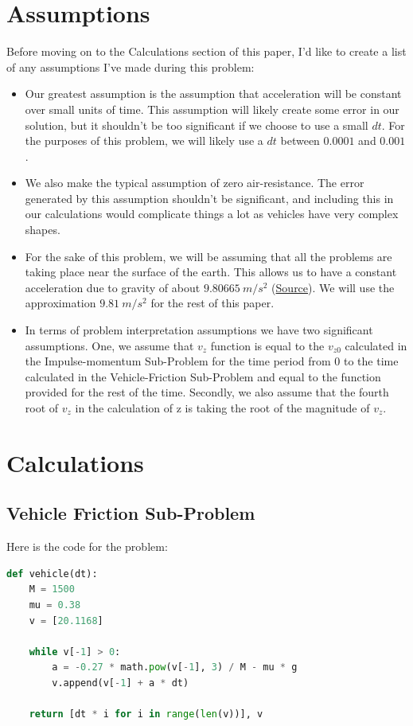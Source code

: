 \documentclass[10pt,letterpaper]{article}
\begin{document}
	\section{Assumptions}
	
	Before moving on to the Calculations section of this paper, I'd like to create a list of any assumptions I've made during this problem:
	\begin{itemize}
		\item Our greatest assumption is the assumption that acceleration will be constant over small units of time. This assumption will likely create some error in our solution, but it shouldn't be too significant if we choose to use a small $dt$. For the purposes of this problem, we will likely use a $dt$ between $0.0001$ and $0.001$.
		\item We also make the typical assumption of zero air-resistance. The error generated by this assumption shouldn't be significant, and including this in our calculations would complicate things a lot as vehicles have very complex shapes.
		\item For the sake of this problem, we will be assuming that all the problems are taking place near the surface of the earth. This allows us to have a constant acceleration due to gravity of about $9.80665\:m/s^2$ (\href{https://nvlpubs.nist.gov/nistpubs/Legacy/SP/nistspecialpublication330e2008.pdf}{Source}). We will use the approximation $9.81\:m/s^2$ for the rest of this paper.
		\item In terms of problem interpretation assumptions we have two significant assumptions. One, we assume that $v_z$ function is equal to the $v_{z0}$ calculated in the Impulse-momentum Sub-Problem for the time period from 0 to the time calculated in the Vehicle-Friction Sub-Problem and equal to the function provided for the rest of the time. Secondly, we also assume that the fourth root of $v_z$ in the calculation of z is taking the root of the magnitude of $v_z$.
	\end{itemize}
	
	\section{Calculations}
		\subsection{Vehicle Friction Sub-Problem}
		 	Here is the code for the problem:
		 	\begin{lstlisting}[language=Python]
def vehicle(dt):
	M = 1500
	mu = 0.38
	v = [20.1168]

	while v[-1] > 0:
		a = -0.27 * math.pow(v[-1], 3) / M - mu * g
		v.append(v[-1] + a * dt)

	return [dt * i for i in range(len(v))], v
			 \end{lstlisting}
\end{document}
